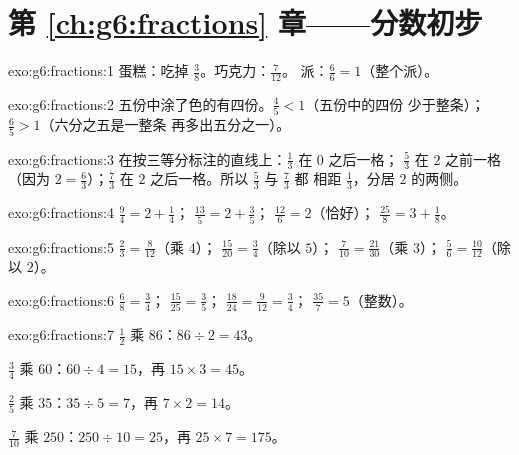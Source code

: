 \section*{第 \ref{ch:g6:fractions} 章——分数初步}

\begin{solution}{exo:g6:fractions:1}
蛋糕：吃掉 $\frac38$。\quad 巧克力：$\frac{7}{12}$。\quad
派：$\frac66 = 1$（整个派）。
\end{solution}

\begin{solution}{exo:g6:fractions:2}
五份中涂了色的有四份。$\frac45 < 1$（五份中的四份
少于整条）；$\frac65 > 1$（六分之五是一整条
再多出五分之一）。
\end{solution}

\begin{solution}{exo:g6:fractions:3}
在按三等分标注的直线上：$\frac13$ 在 $0$ 之后一格；
$\frac53$ 在 $2$ 之前一格（因为 $2 = \frac63$）；$\frac73$ 在
$2$ 之后一格。所以 $\frac53$ 与 $\frac73$ 都
相距 $\frac13$，分居 $2$ 的两侧。
\end{solution}

\begin{solution}{exo:g6:fractions:4}
$\frac94 = 2 + \frac14$；\quad
$\frac{13}{5} = 2 + \frac35$；\quad
$\frac{12}{6} = 2$（恰好）；\quad
$\frac{25}{8} = 3 + \frac18$。
\end{solution}

\begin{solution}{exo:g6:fractions:5}
$\frac23 = \frac{8}{12}$（乘 $4$）；\quad
$\frac{15}{20} = \frac34$（除以 $5$）；\quad
$\frac{7}{10} = \frac{21}{30}$（乘 $3$）；\quad
$\frac56 = \frac{10}{12}$（除以 $2$）。
\end{solution}

\begin{solution}{exo:g6:fractions:6}
$\frac68 = \frac34$；\quad
$\frac{15}{25} = \frac35$；\quad
$\frac{18}{24} = \frac{9}{12} = \frac34$；\quad
$\frac{35}{7} = 5$（整数）。
\end{solution}

\begin{solution}{exo:g6:fractions:7}
$\frac12$ 乘 $86$：$86 \div 2 = 43$。

$\frac34$ 乘 $60$：$60 \div 4 = 15$，再 $15 \times 3 = 45$。

$\frac25$ 乘 $35$：$35 \div 5 = 7$，再 $7 \times 2 = 14$。

$\frac{7}{10}$ 乘 $250$：$250 \div 10 = 25$，再 $25 \times 7 = 175$。
\end{solution}

